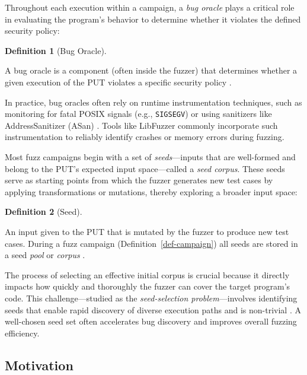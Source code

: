 \documentclass[
  a4paper,
]{scrreprt}
\theoremstyle{definition}
\newtheorem{definition}{Definition}[chapter]
\theoremstyle{remark}
\begin{document}
Throughout each execution within a campaign, a \emph{bug oracle} plays a
critical role in evaluating the program's behavior to determine whether
it violates the defined security policy:

\begin{definition}[Bug
Oracle]\protect\hypertarget{def-oracle}{}\label{def-oracle}

A bug oracle is a component (often inside the fuzzer) that determines
whether a given execution of the PUT violates a specific security policy
\autocite{manes2019}.

\end{definition}

In practice, bug oracles often rely on runtime instrumentation
techniques, such as monitoring for fatal POSIX signals (e.g.,
\texttt{SIGSEGV}) or using sanitizers like AddressSanitizer (ASan)
\autocite{serebryany2012}. Tools like LibFuzzer \autocite{libfuzzer}
commonly incorporate such instrumentation to reliably identify crashes
or memory errors during fuzzing.

Most fuzz campaigns begin with a set of \emph{seeds}---inputs that are
well-formed and belong to the PUT's expected input space---called a
\emph{seed corpus}. These seeds serve as starting points from which the
fuzzer generates new test cases by applying transformations or
mutations, thereby exploring a broader input space:

\begin{definition}[Seed]\protect\hypertarget{def-seed}{}\label{def-seed}

An input given to the PUT that is mutated by the fuzzer to produce new
test cases. During a fuzz campaign (Definition~\ref{def-campaign}) all
seeds are stored in a seed \emph{pool} or \emph{corpus}
\autocite{manes2019}.

\end{definition}

The process of selecting an effective initial corpus is crucial because
it directly impacts how quickly and thoroughly the fuzzer can cover the
target program's code. This challenge---studied as the
\emph{seed-selection problem}---involves identifying seeds that enable
rapid discovery of diverse execution paths and is non-trivial
\autocite{rebert2014}. A well-chosen seed set often accelerates bug
discovery and improves overall fuzzing efficiency.

\subsection{Motivation}\label{motivation}
\end{document}
